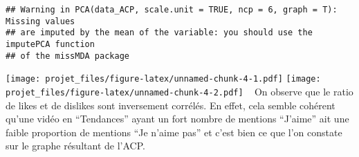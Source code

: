 \documentclass[
]{article}
\newenvironment{Shaded}{\begin{snugshade}}{\end{snugshade}}
\newcommand{\CommentTok}[1]{\textcolor[rgb]{0.56,0.35,0.01}{\textit{#1}}}
\newcommand{\DataTypeTok}[1]{\textcolor[rgb]{0.13,0.29,0.53}{#1}}
\newcommand{\DecValTok}[1]{\textcolor[rgb]{0.00,0.00,0.81}{#1}}
\newcommand{\KeywordTok}[1]{\textcolor[rgb]{0.13,0.29,0.53}{\textbf{#1}}}
\newcommand{\NormalTok}[1]{#1}
\newcommand{\OperatorTok}[1]{\textcolor[rgb]{0.81,0.36,0.00}{\textbf{#1}}}
\newcommand{\OtherTok}[1]{\textcolor[rgb]{0.56,0.35,0.01}{#1}}
\newcommand{\StringTok}[1]{\textcolor[rgb]{0.31,0.60,0.02}{#1}}
\begin{document}
\begin{Shaded}
\end{Shaded}

\begin{verbatim}
## Warning in PCA(data_ACP, scale.unit = TRUE, ncp = 6, graph = T): Missing values
## are imputed by the mean of the variable: you should use the imputePCA function
## of the missMDA package
\end{verbatim}

\texttt{[image: projet\_files/figure-latex/unnamed-chunk-4-1.pdf]}
\texttt{[image: projet\_files/figure-latex/unnamed-chunk-4-2.pdf]}   On
observe que le ratio de likes et de dislikes sont inversement corrélés.
En effet, cela semble cohérent qu'une vidéo en ``Tendances'' ayant un
fort nombre de mentions ``J'aime'' ait une faible proportion de mentions
``Je n'aime pas'' et c'est bien ce que l'on constate sur le graphe
résultant de l'ACP.
\end{document}
